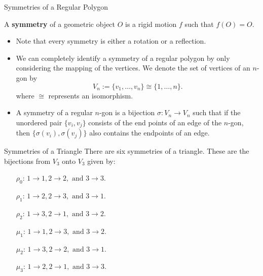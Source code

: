 \documentclass{beamer}
\begin{document}
\begin{frame}{Symmetries of a Regular Polygon}
\begin{definition}
\justifying
A \textbf{symmetry} of a geometric object $O$ is a rigid motion $f$ such that $f(O) = O$.
\end{definition}

\begin{itemize}
\justifying
\item Note that every symmetry is either a rotation or a reflection.
\item We can completely identify a symmetry of a regular polygon by only considering the mapping of the vertices. We denote the set of vertices of an $n$-gon by
\[
V_n := \{v_1, \dots, v_n\} \cong \{1, \dots, n\}.
\]
where $\cong$ represents an isomorphism.
\item A symmetry of a regular $n$-gon is a bijection $\sigma : V_n \to V_n$ such that if the unordered pair $\{v_i, v_j\}$ consists of the end points of an edge of the $n$-gon, then $\{\sigma(v_i), \sigma(v_j)\}$ also contains the endpoints of an edge.
\end{itemize}

\end{frame}

\begin{frame}{Symmetries of a Triangle}
\justifying
There are six symmetries of a triangle. These are the bijections from $V_3$ onto $V_3$ given by:
\begin{enumerate}
\justifying
\item[$\rho_0$:] $1 \rightarrow 1, 2 \rightarrow 2, \text{ and } 3 \rightarrow 3.$
\item[$\rho_1$:] $1 \rightarrow 2, 2 \rightarrow 3, \text{ and } 3 \rightarrow 1.$
\item[$\rho_2$:] $1 \rightarrow 3, 2 \rightarrow 1, \text{ and } 3 \rightarrow 2.$
\item[$\mu_1$:] $1 \rightarrow 1, 2 \rightarrow 3, \text{ and } 3 \rightarrow 2.$
\item[$\mu_2$:] $1 \rightarrow 3, 2 \rightarrow 2, \text{ and } 3 \rightarrow 1.$
\item[$\mu_3$:] $1 \rightarrow 2, 2 \rightarrow 1, \text{ and } 3 \rightarrow 3.$
\end{enumerate}
\end{frame}
\end{document}
